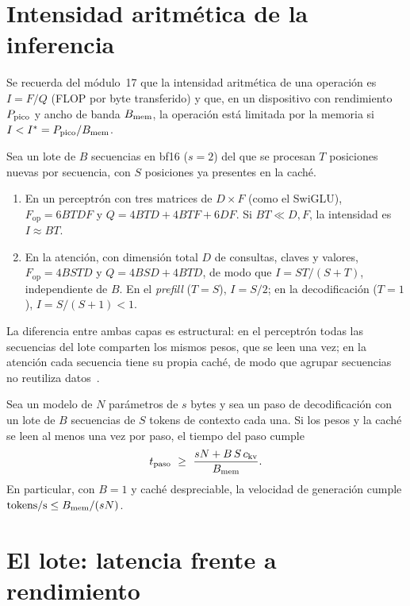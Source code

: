 \section{Intensidad aritmética de la inferencia}

Se recuerda del módulo~17 que la intensidad aritmética de una operación es $I=F/Q$ (FLOP por byte transferido) y que, en un dispositivo con rendimiento $P_{\mathrm{pico}}$ y ancho de banda $B_{\mathrm{mem}}$, la operación está limitada por la memoria si $I<I^{\ast}=P_{\mathrm{pico}}/B_{\mathrm{mem}}$.

\begin{proposicion}\label{prop:intensidad-capas}
Sea un lote de $B$ secuencias en bf16 ($s=2$) del que se procesan $T$ posiciones nuevas por secuencia, con $S$ posiciones ya presentes en la caché.
\begin{enumerate}[label=(\alph*)]
  \item En un perceptrón con tres matrices de $D\times F$ (como el SwiGLU), $F_{\mathrm{op}}=6BTDF$ y $Q=4BTD+4BTF+6DF$. Si $BT\ll D,F$, la intensidad es $I\approx BT$.
  \item En la atención, con dimensión total $D$ de consultas, claves y valores, $F_{\mathrm{op}}=4BSTD$ y $Q=4BSD+4BTD$, de modo que $I=ST/(S+T)$, independiente de $B$. En el \emph{prefill} ($T=S$), $I=S/2$; en la decodificación ($T=1$), $I=S/(S+1)<1$.
\end{enumerate}
\end{proposicion}

La diferencia entre ambas capas es estructural: en el perceptrón todas las secuencias del lote comparten los mismos pesos, que se leen una vez; en la atención cada secuencia tiene su propia caché, de modo que agrupar secuencias no reutiliza datos~\cite{cs336}.

\begin{teorema}\label{teo:cota-memoria}
Sea un modelo de $N$ parámetros de $s$ bytes y sea un paso de decodificación con un lote de $B$ secuencias de $S$ tokens de contexto cada una. Si los pesos y la caché se leen al menos una vez por paso, el tiempo del paso cumple
\[
t_{\mathrm{paso}}\ \ge\ \frac{sN+B\,S\,c_{\mathrm{kv}}}{\Bmem}.
\]
En particular, con $B=1$ y caché despreciable, la velocidad de generación cumple $\text{tokens/s}\le B_{\mathrm{mem}}/(sN)$.
\end{teorema}

\addtocounter{definicion}{1}%

\section{El lote: latencia frente a rendimiento}

